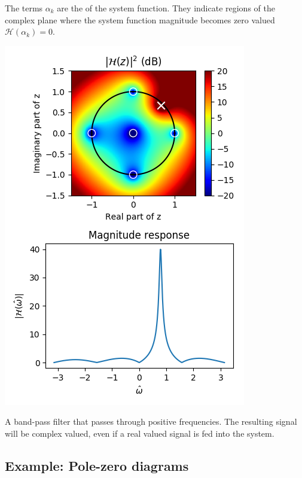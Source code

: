 The terms $\alpha_{k}$ are the \emph{} of the
system function. They indicate regions of the complex plane where the
system function magnitude becomes zero valued $\mathcal{H}(\alpha_{k}) = 0$.
\begin{marginfigure}[-5cm]
\includegraphics[width=\textwidth]{code/026_iir/ex7.png}
\caption{A band-pass filter that passes through positive frequencies. The resulting signal will be complex valued, even if a real valued signal is fed into the system.}
\label{fig:pzex3}
\end{marginfigure}

\subsection{Example: Pole-zero diagrams}

